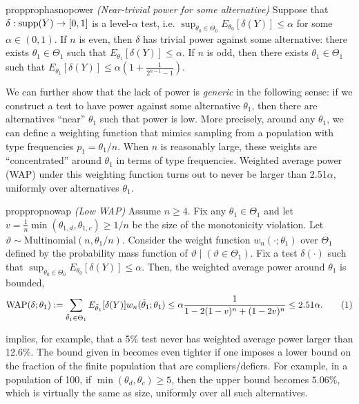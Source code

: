 \documentclass[12pt,reqno]{amsart}
\begin{document}
\begin{restatable}{prop}{prophasnopower}
\emph{(Near-trivial power for some alternative)}
Suppose that $\delta: \operatorname{supp}(Y) \to [0,1]$ is a level-$\alpha$ test, i.e. $\sup_{\theta_0
\in \Theta_0} E_{\theta_0}[\delta(Y)] \leq \alpha$ for some $\alpha \in (0,1)$. If $n$ is
even, then $\delta$ has trivial power against some alternative: there exists $\theta_1 \in
\Theta_1$ such that $E_{\theta_1}[\delta(Y)] \leq \alpha$. If $n$ is odd, then there
exists $\theta_1 \in \Theta_1$ such that $E_{\theta_1}[\delta(Y)] \leq \alpha \left(1 + \tfrac{1}
{2^{n-1}-1} \right)$.
\end{restatable}

We can further show that the lack of power is \emph{generic} in the following sense: if we
construct a test to have power against some alternative $\theta_1$, then there are
alternatives
``near'' $\theta_1$ such that power is low. More precisely, around any $\theta_1$,
we can define a weighting function that mimics sampling from a population with type
frequencies $p_1 = \theta_1/n$. When $n$ is reasonably large, these weights are
``concentrated'' around $\theta_1$ in terms of type frequencies. Weighted average power (WAP) under this weighting
function turns out to never be larger than 2.51$\alpha$, uniformly over alternatives
$\theta_1$.
\begin{restatable}{prop}{propnowap}
\label{prop:nowap}
\emph{(Low WAP)}    Assume $n \geq 4$. Fix any $\theta_1 \in \Theta_1$ and let $v = \tfrac{1}{n} \min(\theta_{1,d},
\theta_{1,c}) \ge 1/n$ be
the
size of the monotonicity violation. Let $\vartheta \sim
\mathrm{Multinomial} (n, \theta_1/n)$. 
Consider the weight function $w_n(\cdot; \theta_1)$ over
$\Theta_1$ defined by the probability mass function of $\vartheta \mid (\vartheta \in
\Theta_1)$. Fix a test $\delta(\cdot)$ such that $\sup_{\theta_0 \in\Theta_0} E_{\theta_0}[\delta
(Y)] \le \alpha$. Then, the weighted average power around $\theta_1$ is bounded,
\[
    \mathrm{WAP}(\delta; \theta_1) := \sum_{\tilde{\theta}_1 \in \Theta_1} E_{\tilde\theta_1}[\delta
    (Y)] w_n
    (\tilde{\theta}_1;\theta_1) \le \alpha  \frac{1}{1-2(1-v)^n+(1-2v)^n} \le 2.51 \alpha.
    \numberthis
    \label{eq:wap}
\]
\end{restatable}

 implies, for example, that a 5\% test never has weighted average power
larger than 12.6\%. The bound given in  becomes even tighter if one
imposes a lower bound on the fraction of the finite population that are compliers/defiers.
For example, in a population of 100, if $\min(\theta_d, \theta_c) \ge 5$, then the upper
bound becomes $5.06\%$, which is virtually the same as size, uniformly over all such
alternatives.
\end{document}
